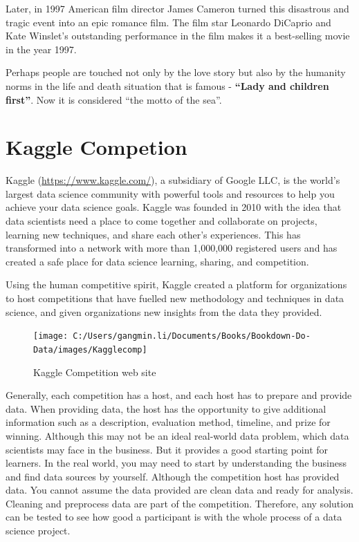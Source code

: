 \documentclass[
]{book}
\begin{document}
Later, in 1997 American film director James Cameron turned this disastrous and tragic event into an epic romance film. The film star Leonardo DiCaprio and Kate Winslet's outstanding performance in the film makes it a best-selling movie in the year 1997.

Perhaps people are touched not only by the love story but also by the humanity norms in the life and death situation that is famous - \textbf{``Lady and children first''}. Now it is considered ``the motto of the sea''.

\hypertarget{Competion}{%
\section{Kaggle Competion}\label{Competion}}

Kaggle (\url{https://www.kaggle.com/}), a subsidiary of Google LLC, is the world's largest data science community with powerful tools and resources to help you achieve your data science goals. Kaggle was founded in 2010 with the idea that data scientists need a place to come together and collaborate on projects, learning new techniques, and share each other's experiences. This has transformed into a network with more than 1,000,000 registered users and has created a safe place for data science learning, sharing, and competition.

Using the human competitive spirit, Kaggle created a platform for organizations to host competitions that have fuelled new methodology and techniques in data science, and given organizations new insights from the data they provided.

\begin{figure}

{\centering \texttt{[image: C:/Users/gangmin.li/Documents/Books/Bookdown-Do-Data/images/Kagglecomp]} 

}

\caption{Kaggle Competition web site}\label{fig:unnamed-chunk-2}
\end{figure}

Generally, each competition has a host, and each host has to prepare and provide data. When providing data, the host has the opportunity to give additional information such as a description, evaluation method, timeline, and prize for winning. Although this may not be an ideal real-world data problem, which data scientists may face in the business. But it provides a good starting point for learners. In the real world, you may need to start by understanding the business and find data sources by yourself. Although the competition host has provided data. You cannot assume the data provided are clean data and ready for analysis. Cleaning and preprocess data are part of the competition. Therefore, any solution can be tested to see how good a participant is with the whole process of a data science project.
\end{document}
